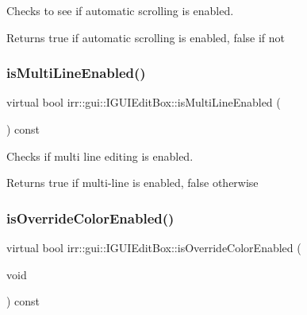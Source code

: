 Checks to see if automatic scrolling is enabled. 

\begin{DoxyReturn}{Returns}
true if automatic scrolling is enabled, false if not 
\end{DoxyReturn}
\mbox{\label{classirr_1_1gui_1_1IGUIEditBox_a0be3338bc094fc93c9f0e4ed842835d6}} 
\subsubsection{\texorpdfstring{is\+Multi\+Line\+Enabled()}{isMultiLineEnabled()}}
{\footnotesize\ttfamily virtual bool irr\+::gui\+::\+I\+G\+U\+I\+Edit\+Box\+::is\+Multi\+Line\+Enabled (\begin{DoxyParamCaption}{ }\end{DoxyParamCaption}) const\hspace{0.3cm}{\ttfamily [pure virtual]}}



Checks if multi line editing is enabled. 

\begin{DoxyReturn}{Returns}
true if multi-\/line is enabled, false otherwise 
\end{DoxyReturn}
\mbox{\label{classirr_1_1gui_1_1IGUIEditBox_ae62dac299d0101be9d78ed3db9a2d314}} 
\subsubsection{\texorpdfstring{is\+Override\+Color\+Enabled()}{isOverrideColorEnabled()}}
{\footnotesize\ttfamily virtual bool irr\+::gui\+::\+I\+G\+U\+I\+Edit\+Box\+::is\+Override\+Color\+Enabled (\begin{DoxyParamCaption}\item[{void}]{ }\end{DoxyParamCaption}) const\hspace{0.3cm}{\ttfamily [pure virtual]}}



